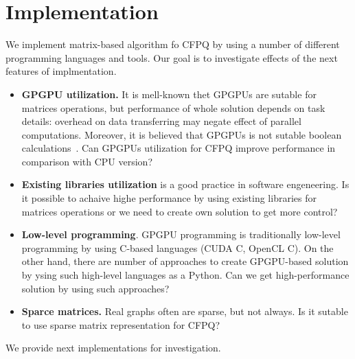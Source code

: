 \section{Implementation}

We implement matrix-based algorithm fo CFPQ by using a number of different programming languages and tools.
Our goal is to investigate effects of the next features of implmentation.
\begin{itemize}
\item \textbf{GPGPU utilization.} 
It is mell-known thet GPGPUs are sutable for matrices operations, but performance of whole solution depends on task details: overhead on data transferring may negate effect of parallel computations. 
Moreover, it is believed that GPGPUs is not sutable boolean calculations~\cite{!!!}. 
Can GPGPUs utilization for CFPQ improve performance in comparison with CPU version?

\item \textbf{Existing libraries utilization} is a good practice in software engeneering.
Is it possible to achaive highe performance by using existing libraries for matrices operations or we need to create own solution to get more control?

\item \textbf{Low-level programming}. 
GPGPU programming is traditionally low-level programming by using C-based languages (CUDA C, OpenCL C). 
On the other hand, there are number of approaches to create GPGPU-based solution by ysing such high-level languages as a Python. 
Can we get high-performance solution by using such approaches?

\item \textbf{Sparce matrices.} Real graphs often are sparse, but not always.
Is it sutable to use sparse matrix representation for CFPQ? 

\end{itemize}

We provide next implementations for investigation.

